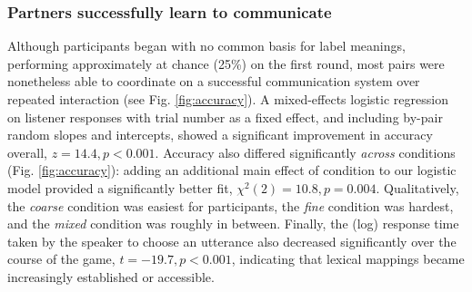 \documentclass[10pt,letterpaper]{article}
\begin{document}
\subsubsection{Partners successfully learn to communicate}

Although participants began with no common basis for label meanings, performing approximately at chance (25\%) on the first round, most pairs were nonetheless able to coordinate on a successful communication system over repeated interaction (see Fig. \ref{fig:accuracy}). 
A mixed-effects logistic regression on listener responses with trial number as a fixed effect, and including by-pair random slopes and intercepts, showed a significant improvement in accuracy overall, $z = 14.4, p < 0.001$. 
Accuracy also differed significantly \emph{across} conditions (Fig. \ref{fig:accuracy}): adding an additional main effect of condition to our logistic model provided a significantly better fit, $\chi^2(2) = 10.8, p = 0.004$. Qualitatively, the \emph{coarse} condition was easiest for participants, the \emph{fine} condition was hardest, and the \emph{mixed} condition was roughly in between. %
Finally, the (log) response time taken by the speaker to choose an utterance also decreased significantly over the course of the game, $t = -19.7, p < 0.001$, indicating that lexical mappings became increasingly established or accessible.
\end{document}
